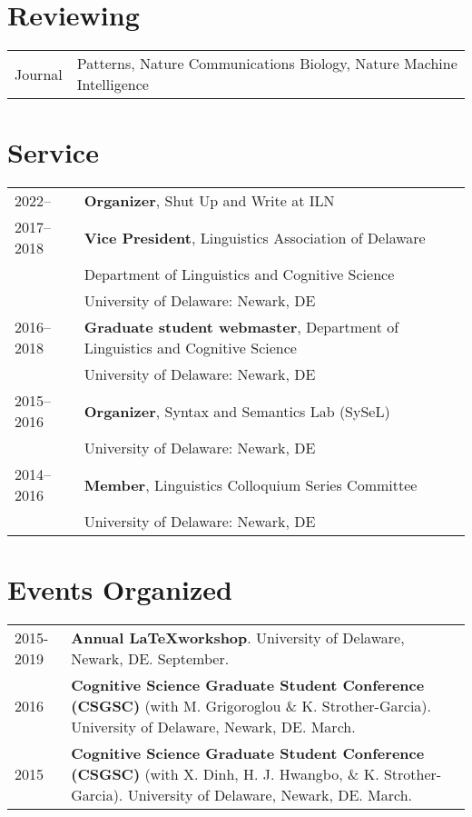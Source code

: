 \documentclass[11pt]{article} %
\begin{document}
\section*{Reviewing}

\begin{tabular}{p{1in} p{5.3in}}
	Journal & Patterns, Nature Communications Biology, Nature Machine Intelligence \\
\end{tabular}


\section*{Service}

\begin{longtable}{p{1in} p{5.3in}}
	2022-- & \textbf{Organizer}, Shut Up and Write at ILN \\
	2017--2018 & \textbf{Vice President}, Linguistics Association of Delaware \\
	& Department of Linguistics and Cognitive Science \\ 
	& University of Delaware: Newark, DE \\[5pt]
2016--2018 & \textbf{Graduate student webmaster}, Department of Linguistics and Cognitive Science \\ 
 & University of Delaware: Newark, DE \\[5pt]
2015--2016 & \textbf{Organizer}, Syntax and Semantics Lab (SySeL) \\
& University of Delaware: Newark, DE \\ [5pt]
2014--2016 & \textbf{Member}, Linguistics Colloquium Series Committee \\
& University of Delaware: Newark, DE \\ 
\end{longtable}

\section*{Events Organized}
\begin{longtable}{p{1in} p{5.3in}}
	2015-2019 & \textbf{Annual \LaTeX workshop}. University of Delaware, Newark, DE. September. \\ [5pt]
2016 &   \textbf{Cognitive Science Graduate Student Conference (CSGSC)} (with M. Grigoroglou
\& K. Strother-Garcia).  University of Delaware, Newark, DE.  March. \\ [5pt]
2015 &  \textbf{Cognitive Science Graduate Student Conference (CSGSC)} (with X. Dinh, H. J. Hwangbo, 
\& K. Strother-Garcia).  University of Delaware, Newark, DE.  March. \\ [5pt]
\end{longtable}
\end{document}
